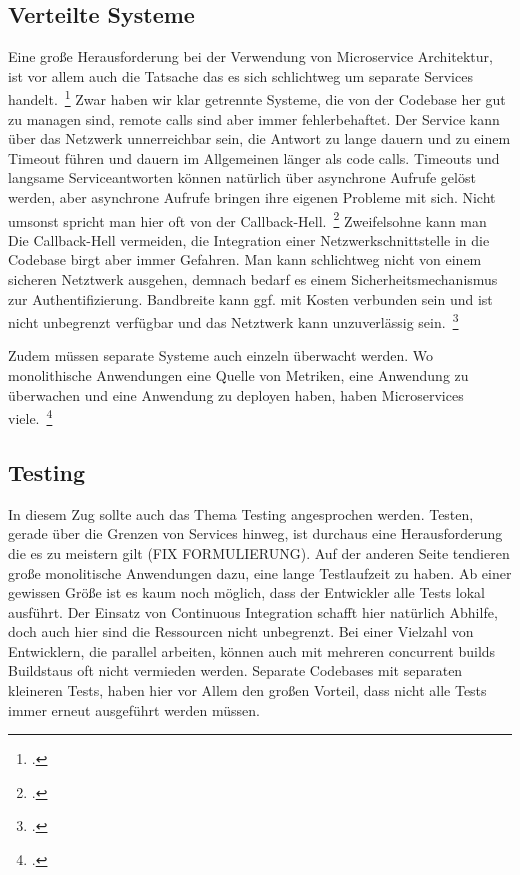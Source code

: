 \subsection{Verteilte Systeme}
Eine große Herausforderung bei der Verwendung von Microservice Architektur, ist vor allem auch die Tatsache das es sich schlichtweg um separate Services handelt.~\footcite[][]{microtradeoffs} Zwar haben wir klar getrennte Systeme, die von der Codebase her gut zu managen sind, remote calls sind aber immer fehlerbehaftet. Der Service kann über das Netzwerk unnerreichbar sein, die Antwort zu lange dauern und zu einem Timeout führen und dauern im Allgemeinen länger als code calls. Timeouts und langsame Serviceantworten können natürlich über asynchrone Aufrufe gelöst werden, aber asynchrone Aufrufe bringen ihre eigenen Probleme mit sich. Nicht umsonst spricht man hier oft von der Callback-Hell.~\footcite[vgl.][]{callbackhell} Zweifelsohne kann man Die Callback-Hell vermeiden, die Integration einer Netzwerkschnittstelle in die Codebase birgt aber immer Gefahren. Man kann schlichtweg nicht von einem sicheren Netztwerk ausgehen, demnach bedarf es einem Sicherheitsmechanismus zur Authentifizierung. Bandbreite kann ggf. mit Kosten verbunden sein und ist nicht unbegrenzt verfügbar und das Netztwerk kann unzuverlässig sein.~\footcite[vgl.][]{distributedfallacies}

Zudem müssen separate Systeme auch einzeln überwacht werden. Wo monolithische Anwendungen eine Quelle von Metriken, eine Anwendung zu überwachen und eine Anwendung zu deployen haben, haben Microservices viele.~\footcite[vgl.][]{Heroku:GoMicro}

\subsection{Testing}
In diesem Zug sollte auch das Thema Testing angesprochen werden. Testen, gerade über die Grenzen von Services hinweg, ist durchaus eine Herausforderung die es zu meistern gilt (FIX FORMULIERUNG). Auf der anderen Seite tendieren große monolitische Anwendungen dazu, eine lange Testlaufzeit zu haben. Ab einer gewissen Größe ist es kaum noch möglich, dass der Entwickler alle Tests lokal ausführt. Der Einsatz von Continuous Integration schafft hier natürlich Abhilfe, doch auch hier sind die Ressourcen nicht unbegrenzt. Bei einer Vielzahl von Entwicklern, die parallel arbeiten, können auch mit mehreren concurrent builds Buildstaus oft nicht vermieden werden. Separate Codebases mit separaten kleineren Tests, haben hier vor Allem den großen Vorteil, dass nicht alle Tests immer erneut ausgeführt werden müssen.


